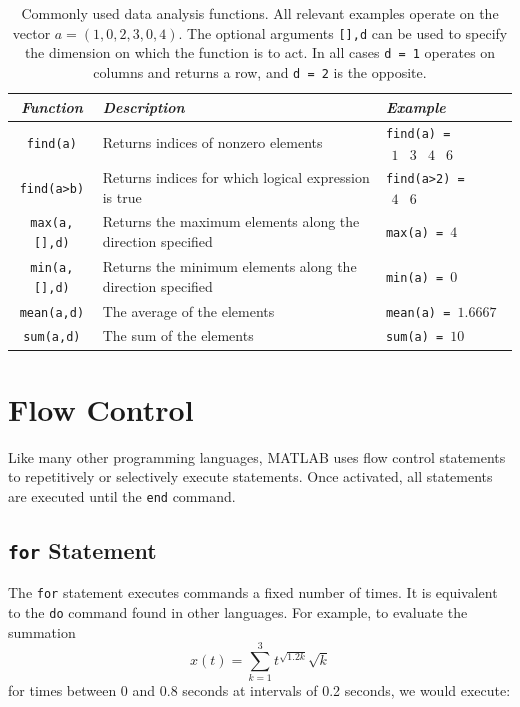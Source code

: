 \begin{table}[bht]
\centering
\renewcommand{\arraystretch}{1.2}
\begin{tabular}{c|p{1.65in}|p{}}
    \textit{Function}   &\parbox{1.5in}{\centering\textit{Description}}& \parbox{.3\textwidth}{\centering\textit{Example}} \\ \hline \hline
    \verb=find(a)=  & Returns indices of nonzero elements &
        \verb#find(a) = #$\begin{array}{cccc}1&3&4&6\end{array}$ \\
    \verb=find(a>b)= & Returns indices for which logical expression is true&
        \verb#find(a>2) = #$\begin{array}{cc}4&6\end{array}$    \\
    \verb=max(a,[],d)= & Returns the maximum elements along the direction
        specified & \verb#max(a) = #$4$ \\
    \verb=min(a,[],d)= & Returns the minimum elements along the direction
        specified & \verb#min(a) = #$0$ \\
    \verb=mean(a,d)= & The average of the elements &
        \verb#mean(a) = #$1.6667$ \\
    \verb=sum(a,d)= & The sum of the elements   &
        \verb#sum(a) = #$10$
\end{tabular}
\caption{\footnotesize
        Commonly used data analysis functions.
        All relevant examples operate on the vector
        $a = (1,0,2,3,0,4)$.
        The optional arguments \texttt{[],d} can be used to specify the dimension on which the function is to act.  In all cases
        \texttt{d = 1}
        operates on columns and returns a row, and
        \texttt{d = 2}
        is the opposite.
        \label{tab.dataanalysis}
        }
\end{table}

\section{Flow Control} \label{sec.matlab.flowcont}
Like many other programming languages, MATLAB uses flow control statements to repetitively or selectively execute statements.  Once activated, all statements are executed until the \verb=end= command.

\subsection{\texttt{for} Statement}
The \verb=for= statement executes commands a fixed number of times.  It is equivalent to the \verb=do= command found in other languages.  For example, to evaluate the summation
\begin{equation*}
    x(t) = \sum_{k=1}^{3} t^{\sqrt{1.2k}} \sqrt{k}
\end{equation*}
for times between 0 and 0.8 seconds at intervals of 0.2 seconds, we would execute:

